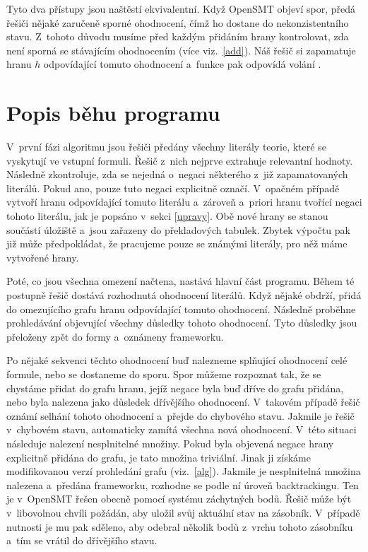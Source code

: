Tyto dva přístupy jsou naštěstí ekvivalentní. Když OpenSMT objeví spor, předá řešiči nějaké zaručeně sporné ohodnocení, čímž ho dostane do nekonzistentního stavu. Z~tohoto důvodu musíme před každým přidáním hrany kontrolovat, zda není sporná se stávajícím ohodnocením (více viz.~\ref{add}). Náš řešič si zapamatuje hranu $h$ odpovídající tomuto ohodnocení a~funkce  pak odpovídá volání . 

\section{Popis běhu programu}

V~první fázi algoritmu jsou řešiči předány všechny literály teorie, které se vyskytují ve vstupní formuli. Řešič z~nich nejprve extrahuje relevantní hodnoty. Následně zkontroluje, zda se nejedná o~negaci některého z~již zapamatovaných literálů. Pokud ano, pouze tuto negaci explicitně označí. V~opačném případě vytvoří hranu odpovídající tomuto literálu a~zároveň a~priori hranu tvořící negaci tohoto literálu, jak je popsáno v~sekci \ref{upravy}. Obě nové hrany se stanou součástí úložiště a~jsou zařazeny do překladových tabulek. Zbytek výpočtu pak již může předpokládat, že pracujeme pouze se známými literály, pro něž máme vytvořené hrany.

Poté, co jsou všechna omezení načtena, nastává hlavní část programu. Během té postupně řešič dostává rozhodnutá ohodnocení literálů. Když nějaké obdrží, přidá do omezujícího grafu hranu odpovídající tomuto ohodnocení. Následně proběhne prohledávání objevující všechny důsledky tohoto ohodnocení. Tyto důsledky jsou přeloženy zpět do formy  a~oznámeny frameworku.

Po nějaké sekvenci těchto ohodnocení buď nalezneme splňující ohodnocení celé formule, nebo se dostaneme do sporu. Spor můžeme rozpoznat tak, že se chystáme přidat do grafu hranu, jejíž negace byla buď dříve do grafu přidána, nebo byla nalezena jako důsledek dřívějšího ohodnocení. V~takovém případě řešič oznámí selhání tohoto ohodnocení a~přejde do chybového stavu. Jakmile je řešič v~chybovém stavu, automaticky zamítá všechna nová ohodnocení. V~této situaci následuje nalezení nesplnitelné množiny. Pokud byla objevená negace hrany explicitně přidána do grafu, je tato množina triviální. Jinak ji získáme modifikovanou verzí prohledání grafu (viz.~\ref{alg}). Jakmile je nesplnitelná množina nalezena a~předána frameworku, rozhodne se podle ní úroveň backtrackingu. Ten je v~OpenSMT řešen obecně pomocí systému záchytných bodů. Řešič může být v~libovolnou chvíli požádán, aby uložil svůj aktuální stav na zásobník. V~případě nutnosti je mu pak sděleno, aby odebral několik bodů z~vrchu tohoto zásobníku a~tím se vrátil do dřívějšího stavu. 

